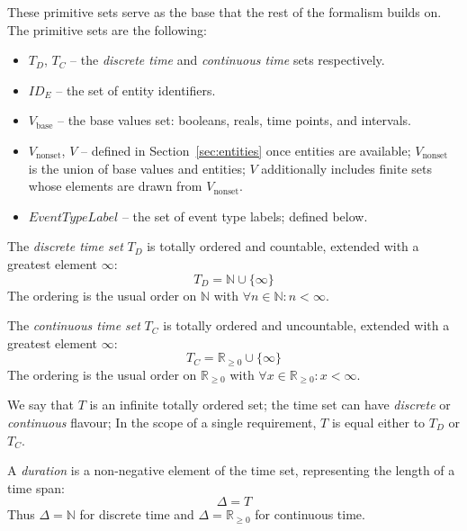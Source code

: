 These primitive sets serve as the base that the rest of the formalism builds on. The primitive sets are the following:
\begin{itemize}
    \item $T_D$, $T_C$ -- the \textit{discrete time} and \textit{continuous time} sets respectively.
    \item $\mathit{ID}_E$ -- the set of entity identifiers.
    \item $V_{\text{base}}$ -- the base values set: booleans, reals, time points, and intervals.
    \item $V_{\text{nonset}}$, $V$ -- defined in Section~\ref{sec:entities} once entities are available; $V_{\text{nonset}}$ is the union of base values and entities; $V$ additionally includes finite sets whose elements are drawn from $V_{\text{nonset}}$.
    \item $\mathit{EventTypeLabel}$ -- the set of event type labels; defined below.
\end{itemize}

\begin{definition}\label{def:time_discrete}
    The \emph{discrete time set} $T_D$ is totally ordered and countable, extended with a greatest element $\infty$:
    \[
        T_D = \mathbb{N} \cup \{\infty\}
    \]
    The ordering is the usual order on $\mathbb{N}$ with $\forall n \in \mathbb{N}: n < \infty$.
\end{definition}

\begin{definition}\label{def:time_continuous}
    The \emph{continuous time set} $T_C$ is totally ordered and uncountable, extended with a greatest element $\infty$:
    \[
        T_C = \mathbb{R}_{\geq 0} \cup \{\infty\}
    \]
    The ordering is the usual order on $\mathbb{R}_{\geq 0}$ with $\forall x \in \mathbb{R}_{\geq 0}: x < \infty$.
\end{definition}

We say that $T$ is an infinite totally ordered set; the time set can have \textit{discrete} or \textit{continuous} flavour; In the scope of a single requirement, $T$ is equal either to $T_D$ or $T_C$.

\begin{definition}[Duration]\label{def:duration}
    A \emph{duration} is a non-negative element of the time set, representing the length of a time span:
    \[
        \Delta = T
    \]
    Thus $\Delta = \mathbb{N}$ for discrete time and $\Delta = \mathbb{R}_{\geq 0}$ for continuous time.
\end{definition}

